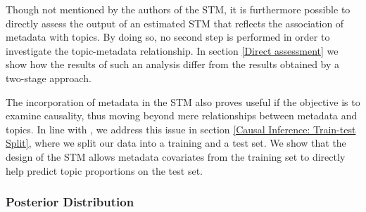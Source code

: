 Though not mentioned by the authors of the STM, it is furthermore possible to directly assess the output of an estimated STM that reflects the association of metadata with topics. By doing so, no second step is performed in order to investigate the topic-metadata relationship. In section \ref{Direct assessment} we show how the results of such an analysis differ from the results obtained by a two-stage approach.

The incorporation of metadata in the STM also proves useful if the objective is to examine causality, thus moving beyond mere relationships between metadata and topics. In line with \cite{egami2018make}, we address this issue in section \ref{Causal Inference: Train-test Split}, where we split our data into a training and a test set. We show that the design of the STM allows metadata covariates from the training set to directly help predict topic proportions on the test set.

\subsubsection*{Posterior Distribution}

